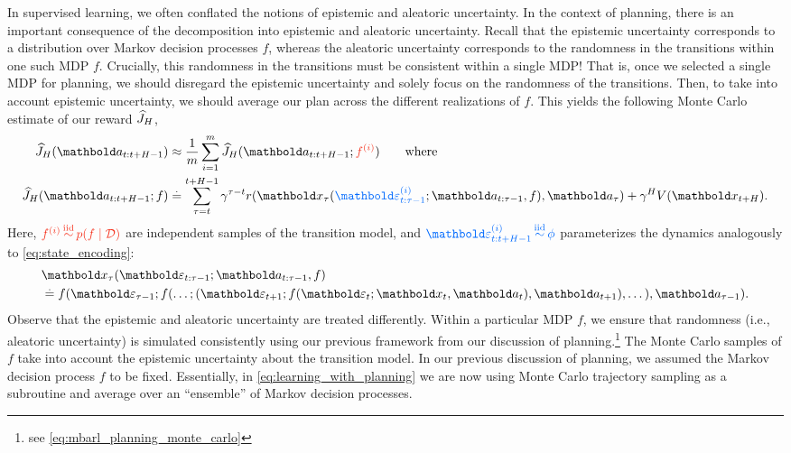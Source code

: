 In supervised learning, we often conflated the notions of epistemic and aleatoric uncertainty.
In the context of planning, there is an important consequence of the decomposition into epistemic and aleatoric uncertainty.
Recall that the epistemic uncertainty corresponds to a distribution over Markov decision processes $f$, whereas the aleatoric uncertainty corresponds to the randomness in the transitions within one such MDP $f$.
Crucially, this randomness in the transitions must be consistent within a single MDP!
That is, once we selected a single MDP for planning, we should disregard the epistemic uncertainty and solely focus on the randomness of the transitions.
Then, to take into account epistemic uncertainty, we should average our plan across the different realizations of $f$.
This yields the following Monte Carlo estimate of our reward $\fnJ[H]$, \begin{align}
  \J{\va_{t:t+H-1}}[H] &\approx \frac{1}{m} \sum_{i=1}^m \J{\va_{t:t+H-1}; \r{f^{(i)}}}[H] \qquad\text{where} \label{eq:learning_with_planning} \\
  \J{\va_{t:t+H-1}; f}[H] &\defeq \sum_{\tau=t}^{t+H-1} \gamma^{\tau-t} r(\vx_\tau(\b{\vvarepsilon_{t:\tau-1}^{(i)}}; \va_{t:\tau-1}, f), \va_\tau) + \gamma^H \V{\vx_{t+H}}.
\end{align}
Here, $\r{f^{(i)} \iid p(f \mid \spD)}$ are independent samples of the transition model, and $\b{\vvarepsilon_{t:t+H-1}^{(i)} \iid \phi}$ parameterizes the dynamics analogously to \cref{eq:state_encoding}: \begin{align}\begin{split}
  &\vx_\tau(\vvarepsilon_{t:\tau-1}; \va_{t:\tau-1}, f) \\
  &\defeq f(\vvarepsilon_{\tau-1}; f(\dots; (\vvarepsilon_{t+1}; f(\vvarepsilon_t; \vx_t, \va_t), \va_{t+1}), \dots), \va_{\tau-1}).
\end{split}\end{align}
Observe that the epistemic and aleatoric uncertainty are treated differently.
Within a particular MDP $f$, we ensure that randomness (i.e., aleatoric uncertainty) is simulated consistently using our previous framework from our discussion of planning.\footnote{see \cref{eq:mbarl_planning_monte_carlo}}
The Monte Carlo samples of $f$ take into account the epistemic uncertainty about the transition model.
In our previous discussion of planning, we assumed the Markov decision process $f$ to be fixed.
Essentially, in \cref{eq:learning_with_planning} we are now using Monte Carlo trajectory sampling as a subroutine and average over an ``ensemble'' of Markov decision processes.

